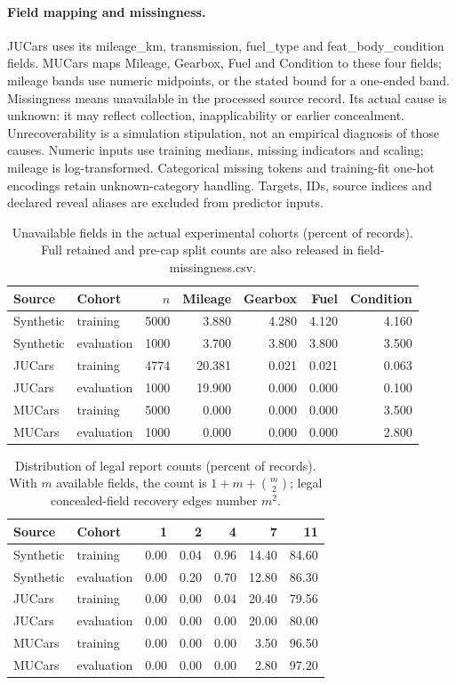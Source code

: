 \documentclass[11pt]{article}
\begin{document}
\paragraph{Field mapping and missingness.}
JUCars uses its mileage\_km, transmission, fuel\_type and feat\_body\_condition
fields. MUCars maps Mileage, Gearbox, Fuel and Condition to these four fields;
mileage bands use numeric midpoints, or the stated bound for a one-ended band.
Missingness means unavailable in the processed source record. Its actual cause
is unknown: it may reflect collection, inapplicability or earlier concealment.
Unrecoverability is a simulation stipulation, not an empirical diagnosis of
those causes. Numeric inputs use training medians, missing indicators and
scaling; mileage is log-transformed. Categorical missing tokens and training-fit
one-hot encodings retain unknown-category handling. Targets, IDs, source
indices and declared reveal aliases are excluded from predictor inputs.
\begin{table}[htbp]\centering\small
\caption{Unavailable fields in the actual experimental cohorts (percent of records). Full retained and pre-cap split counts are also released in field-missingness.csv.}
\begin{tabular}{llrrrrr}\toprule
Source & Cohort & $n$ & Mileage & Gearbox & Fuel & Condition\\\midrule
Synthetic & training & 5000 & 3.880 & 4.280 & 4.120 & 4.160\\
Synthetic & evaluation & 1000 & 3.700 & 3.800 & 3.800 & 3.500\\
JUCars & training & 4774 & 20.381 & 0.021 & 0.021 & 0.063\\
JUCars & evaluation & 1000 & 19.900 & 0.000 & 0.000 & 0.100\\
MUCars & training & 5000 & 0.000 & 0.000 & 0.000 & 3.500\\
MUCars & evaluation & 1000 & 0.000 & 0.000 & 0.000 & 2.800\\
\bottomrule\end{tabular}\end{table}\begin{table}[htbp]\centering\small
\caption{Distribution of legal report counts (percent of records). With $m$ available fields, the count is $1+m+\binom m2$; legal concealed-field recovery edges number $m^2$.}
\begin{tabular}{llrrrrr}\toprule
Source & Cohort & 1 & 2 & 4 & 7 & 11\\\midrule
Synthetic & training & 0.00 & 0.04 & 0.96 & 14.40 & 84.60\\
Synthetic & evaluation & 0.00 & 0.20 & 0.70 & 12.80 & 86.30\\
JUCars & training & 0.00 & 0.00 & 0.04 & 20.40 & 79.56\\
JUCars & evaluation & 0.00 & 0.00 & 0.00 & 20.00 & 80.00\\
MUCars & training & 0.00 & 0.00 & 0.00 & 3.50 & 96.50\\
MUCars & evaluation & 0.00 & 0.00 & 0.00 & 2.80 & 97.20\\
\bottomrule\end{tabular}\end{table}
\end{document}
